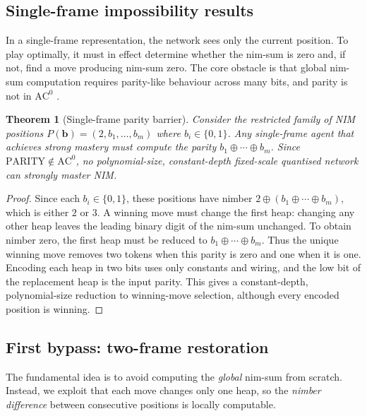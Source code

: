 \documentclass[11pt]{article}
\newcommand{\AC}{\mathrm{AC}}
\theoremstyle{plain}
\newtheorem{theorem}{Theorem}[section]
\theoremstyle{definition}
\theoremstyle{remark}
\numberwithin{equation}{section}
\begin{document}
\subsection{Single-frame impossibility results}
\label{sec:impossibility}

In a single-frame representation, the network sees only the current position. To play optimally, it must in effect determine whether the nim-sum is zero and, if not, find a move producing nim-sum zero. The core obstacle is that global nim-sum computation requires parity-like behaviour across many bits, and parity is not in $\AC^0$ \cite{furst1984parity,hastad1986thesis,smolensky1987algebraic,razborov1987lower}.

\begin{theorem}[Single-frame parity barrier]
\label{thm:singleframe-impossible}
Consider the restricted family of NIM positions $P(\mathbf{b})=(2,b_1,\dots,b_m)$ where $b_i\in\{0,1\}$.
Any single-frame agent that achieves strong mastery must compute the parity $b_1\oplus\cdots\oplus b_m$.
Since $\mathrm{PARITY}\notin \AC^0$, no polynomial-size, constant-depth fixed-scale quantised network can strongly master NIM.
\end{theorem}

\begin{proof}
Since each $b_i\in\{0,1\}$, these positions have nimber $2\oplus(b_1\oplus\cdots\oplus b_m)$, which is either $2$ or $3$. A winning move must change the first heap: changing any other heap leaves the leading binary digit of the nim-sum unchanged. To obtain nimber zero, the first heap must be reduced to $b_1\oplus\cdots\oplus b_m$. Thus the unique winning move removes two tokens when this parity is zero and one when it is one.
Encoding each heap in two bits uses only constants and wiring, and the low bit of the replacement heap is the input parity. This gives a constant-depth, polynomial-size reduction to winning-move selection, although every encoded position is winning.
\end{proof}



\subsection{First bypass: two-frame restoration}
\label{sec:multiframe}

The fundamental idea is to avoid computing the \emph{global} nim-sum from scratch. Instead, we exploit that each move changes only one heap, so the \emph{nimber difference} between consecutive positions is locally computable.
\end{document}
